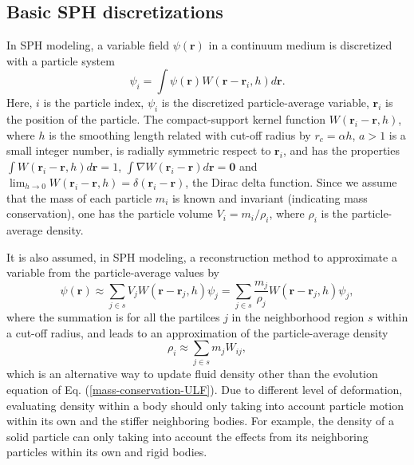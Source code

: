 \documentclass[12pt, a4paper,onecolumn]{article}
\begin{document}
\subsection{Basic SPH discretizations}
In SPH modeling, a variable field $\psi(\mathbf{r})$ in a continuum medium 
is discretized with a particle system   
%
\begin{equation}
\psi_i  = \int \psi(\mathbf{r}) W(\mathbf{r} - \mathbf{r}_i, h)d\mathbf{r}. 
\label{particle-average}
\end{equation}
%
Here, $i$ is the particle index, $\psi_i$ is the discretized particle-average variable,  
$\mathbf{r}_{i}$ is the position of the particle.
The compact-support kernel function $W(\mathbf{r}_{i} - \mathbf{r}, h)$, 
where $h$ is the smoothing length related with cut-off radius by $r_c = \alpha h$, 
$a>1$ is a small integer number, 
is radially symmetric respect to $\mathbf{r}_{i}$,
and has the properties $\int W(\mathbf{r}_{i} - \mathbf{r}, h)
d\mathbf{r} =1 $, $\int\nabla W(\mathbf{r}_{i} - \mathbf{r})d\mathbf{r} = \mathbf{0}$ 
and $\lim_{h\rightarrow 0}W(\mathbf{r}_{i} - \mathbf{r}, h) = \delta(\mathbf{r}_{i} - \mathbf{r})$,
the Dirac delta function.
Since we assume that the mass of each particle $m_i$ is known and invariant (indicating mass conservation),
one has the particle volume $V_i = m_i/\rho_i$, where $\rho_i$ is the particle-average density.

It is also assumed, in SPH modeling, a reconstruction method to approximate 
a variable from the particle-average values by
%
\begin{equation}
\psi(\mathbf{r}) \approx \sum_{j\in s}  V_j W(\mathbf{r} - \mathbf{r}_{j}, h)\psi_j = \sum_{j\in s}  \frac{m_j}{\rho_j} W(\mathbf{r} - \mathbf{r}_{j}, h)\psi_j, 
\label{particle-reconstuction}
\end{equation}
%
where the summation is for all the partilces $j$ in the neighborhood region $s$ within a cut-off radius, 
and leads to an approximation of the particle-average density 
%
\begin{equation}
\rho_i \approx \sum_{j\in s}  m_j W_{ij}, 
\label{particle-density-reconstuction}
\end{equation}
%
which is an alternative way to update fluid density other than the evolution equation of Eq. (\ref{mass-conservation-ULF}).
Due to different level of deformation, 
evaluating density within a body should only taking into account 
particle motion within its own and the stiffer neighboring bodies.
For example, the density of a solid particle can only taking into 
account the effects from its neighboring particles within its own and rigid bodies. 
\end{document}
